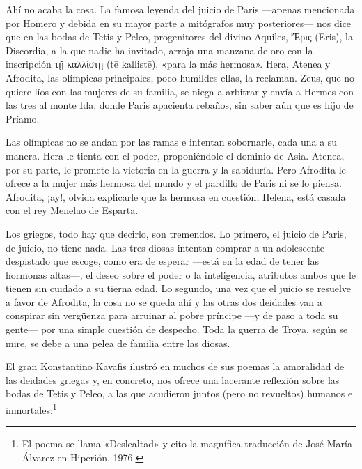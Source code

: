 \documentclass[11pt,a4paper]{article}
\newcommand{\gr}[1]{\foreignlanguage{greek}{#1}}
\begin{document}
Ahí no acaba la cosa. La famosa leyenda del juicio de Paris ---apenas mencionada por Homero y debida en su mayor parte a mitógrafos muy posteriores--- nos dice que
en las bodas de Tetis y Peleo, progenitores del divino Aquiles, \gr{Ἔρις} (Eris), la Discordia, a la que nadie ha invitado, arroja una manzana de oro con la inscripción \gr{τῇ καλλίστῃ} (tē kallistē), «para la más hermosa». Hera, Atenea y Afrodita, las olímpicas principales, poco humildes ellas, la reclaman. Zeus, que no quiere líos con las mujeres de su familia, se niega a arbitrar y envía a Hermes con las tres al monte Ida, donde Paris apacienta rebaños, sin saber aún que es hijo de Príamo.

Las olímpicas no se andan por las ramas e intentan sobornarle, cada una a su manera. Hera le tienta con el poder, proponiéndole el dominio de Asia. Atenea, por su parte, le promete la victoria en la guerra y la sabiduría. Pero Afrodita le ofrece a la mujer más hermosa del mundo y el pardillo de Paris ni se lo piensa. Afrodita, ¡ay!, olvida explicarle que la hermosa en cuestión, Helena, está casada con el rey Menelao de Esparta.

Los griegos, todo hay que decirlo, son tremendos. Lo primero, el juicio de Paris, de juicio, no tiene nada. Las tres diosas intentan comprar a un adolescente despistado que escoge, como era de esperar ---está en la edad de tener las hormonas altas---, el deseo sobre el poder o la inteligencia, atributos ambos que le tienen sin cuidado a su tierna edad. Lo segundo, una vez que el juicio se resuelve a favor de Afrodita, la cosa no se queda ahí y las otras dos deidades van a conspirar sin vergüenza para arruinar al pobre príncipe ---y de paso a toda su gente--- por una simple cuestión de despecho. Toda la guerra de Troya, según se mire, se debe a una pelea de familia entre las diosas.

El gran Konstantino Kavafis ilustró en muchos de sus poemas la amoralidad de las deidades griegas y, en concreto, nos ofrece una lacerante reflexión sobre las bodas de Tetis y Peleo, a las que acudieron juntos (pero no revueltos) humanos e inmortales:\footnote{El poema se llama «Deslealtad» y cito la magnífica traducción de José María Álvarez en Hiperión, 1976.}
\end{document}
